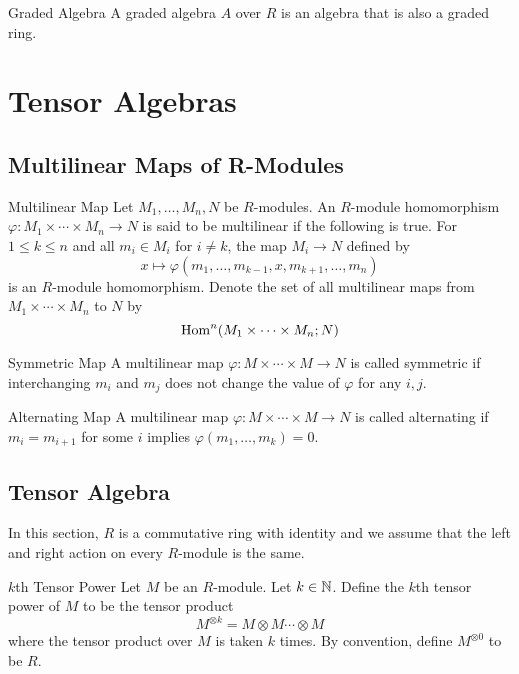 \documentclass[a4paper]{article}
\begin{document}
\begin{defn}{Graded Algebra}{} A graded algebra $A$ over $R$ is an algebra that is also a graded ring. 
\end{defn}

\pagebreak
\section{Tensor Algebras}
\subsection{Multilinear Maps of R-Modules}
\begin{defn}{Multilinear Map}{} Let $M_1,\dots,M_n,N$ be $R$-modules. An $R$-module homomorphism $\varphi:M_1\times\cdots\times M_n\to N$ is said to be multilinear if the following is true. For $1\leq k\leq n$ and all $m_i\in M_i$ for $i\neq k$, the map $M_i\to N$ defined by $$x\mapsto\varphi(m_1,\dots,m_{k-1},x,m_{k+1},\dots,m_n)$$ is an $R$-module homomorphism. Denote the set of all multilinear maps from $M_1\times\cdots\times M_n$ to $N$ by $$\operatorname{Hom}^n(M_1\times\cdots\times M_n;N)$$
\end{defn}

\begin{defn}{Symmetric Map}{} A multilinear map $\varphi:M\times\cdots\times M\to N$ is called symmetric if interchanging $m_i$ and $m_j$ does not change the value of $\varphi$ for any $i,j$. 
\end{defn}

\begin{defn}{Alternating Map}{} A multilinear map $\varphi:M\times\cdots\times M\to N$ is called alternating if $m_i=m_{i+1}$ for some $i$ implies $\varphi(m_1,\dots,m_k)=0$. 
\end{defn}


\subsection{Tensor Algebra}
In this section, $R$ is a commutative ring with identity and we assume that the left and right action on every $R$-module is the same. 

\begin{defn}{$k$th Tensor Power}{} Let $M$ be an $R$-module. Let $k\in\mathbb{N}$. Define the $k$th tensor power of $M$ to be the tensor product $$M^{\otimes k}=M\otimes M\cdots\otimes M$$ where the tensor product over $M$ is taken $k$ times. By convention, define $M^{\otimes 0}$ to be $R$. 
\end{defn}
\end{document}
